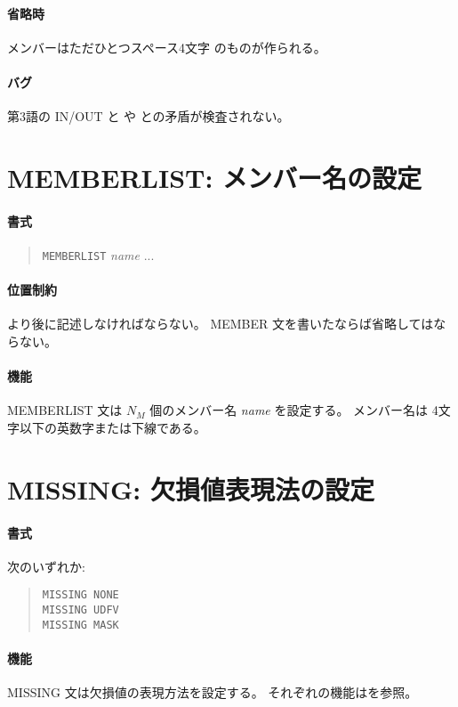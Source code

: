\paragraph{省略時}
メンバーはただひとつスペース4文字 {\tt \SPC\SPC\SPC\SPC} のものが作られる。
\paragraph{バグ}
第3語の IN/OUT と  や
 との矛盾が検査されない。

\section{MEMBERLIST: メンバー名の設定}
\label{sec:def:MEMBERLIST}
\paragraph{書式}
\begin{quote}
{\tt MEMBERLIST} {\it name} ...
\end{quote}
\paragraph{位置制約}
 より後に記述しなければならない。
MEMBER 文を書いたならば省略してはならない。
\paragraph{機能}
MEMBERLIST 文は $N_M$ 個のメンバー名 {\it name} を設定する。
メンバー名は 4文字以下の英数字または下線である。

\section{MISSING: 欠損値表現法の設定}
\label{sec:def:MISSING}
\paragraph{書式}
次のいずれか:
\begin{quote}
{\tt MISSING NONE}\\
{\tt MISSING UDFV}\\
{\tt MISSING MASK}
\end{quote}
\paragraph{機能}
MISSING 文は欠損値の表現方法を設定する。
それぞれの機能はを参照。

